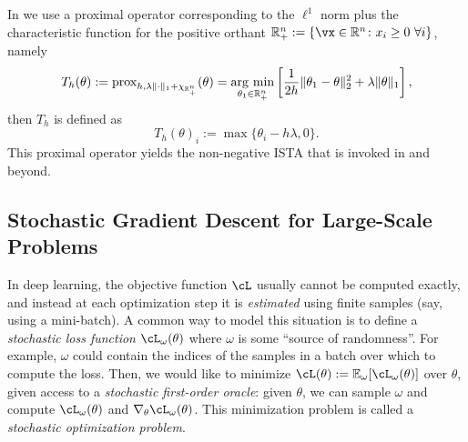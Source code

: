 \documentclass[../../book-main.tex]{subfiles}
\begin{document}
\begin{example}\label{example:prox-of-nonnegative-l1}
    In  we use a proximal operator corresponding to the \(\ell^{1}\) norm plus the characteristic function for the positive orthant \(\R_{+}^{n} := \{\vx \in \R^{n} \colon x_{i} \geq 0\ \forall i\}\), namely
    \begin{equation}
        T_{h}(\theta) := \prox_{h, \lambda\norm{\cdot}_{1} + \chi_{\R_{+}^{n}}}(\theta) = \argmin_{\theta_{1} \in \R_{+}^{n}}\bs{\frac{1}{2h}\norm{\theta_{1} - \theta}_{2}^{2} + \lambda\norm{\theta}_{1}},
    \end{equation}
    then \(T_{h}\) is defined as 
    \begin{equation}
        T_{h}(\theta)_{i} := \max\{\theta_{i} - h\lambda, 0\}.
    \end{equation}
    This proximal operator yields the non-negative ISTA that is invoked in  and beyond.
\end{example}



\subsection{Stochastic Gradient Descent for Large-Scale Problems}


In deep learning, the objective function \(\cL\) usually cannot be computed exactly, and instead at each optimization step it is \textit{estimated} using finite samples (say, using a mini-batch). A common way to model this situation is to define a \textit{stochastic loss function} \(\cL_{\omega}(\theta)\) where \(\omega\) is some ``source of randomness''. For example, \(\omega\) could contain the indices of the samples in a batch over which to compute the loss. Then, we would like to minimize \(\cL(\theta) := \Ex_{\omega}[\cL_{\omega}(\theta)]\) over \(\theta\), given access to a \textit{stochastic first-order oracle}: given \(\theta\), we can sample \(\omega\) and compute \(\cL_{\omega}(\theta)\) and \(\nabla_{\theta}\cL_{\omega}(\theta)\). This minimization problem is called a \textit{stochastic optimization problem}.
\end{document}
